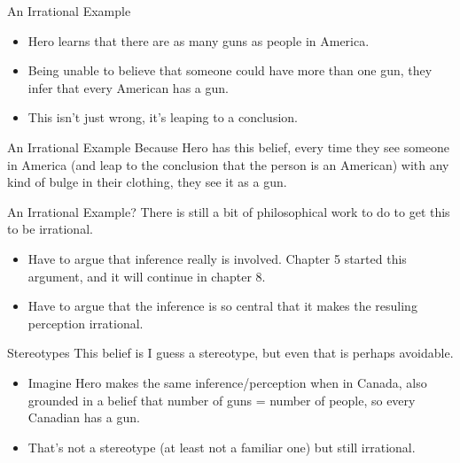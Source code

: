 \documentclass[
  17pt,
  letterpaper,
  ignorenonframetext,
  aspectratio=169,
  xcolor={dvipsnames}]{beamer}
\providecommand{\tightlist}{%
  \setlength{\itemsep}{0pt}\setlength{\parskip}{0pt}}\usepackage{longtable,booktabs,array}
\begin{document}
\begin{frame}{An Irrational Example}
\protect\hypertarget{an-irrational-example}{}
\begin{itemize}[<+->]
\tightlist
\item
  Hero learns that there are as many guns as people in America.
\item
  Being unable to believe that someone could have more than one gun,
  they infer that every American has a gun.
\item
  This isn't just wrong, it's leaping to a conclusion.
\end{itemize}
\end{frame}

\begin{frame}{An Irrational Example}
\protect\hypertarget{an-irrational-example-1}{}
Because Hero has this belief, every time they see someone in America
(and leap to the conclusion that the person is an American) with any
kind of bulge in their clothing, they see it as a gun.
\end{frame}

\begin{frame}{An Irrational Example?}
\protect\hypertarget{an-irrational-example-2}{}
There is still a bit of philosophical work to do to get this to be
irrational.

\begin{itemize}[<+->]
\tightlist
\item
  Have to argue that inference really is involved. Chapter 5 started
  this argument, and it will continue in chapter 8.
\item
  Have to argue that the inference is so central that it makes the
  resuling perception irrational.
\end{itemize}
\end{frame}

\begin{frame}{Stereotypes}
\protect\hypertarget{stereotypes}{}
This belief is I guess a stereotype, but even that is perhaps avoidable.

\begin{itemize}[<+->]
\tightlist
\item
  Imagine Hero makes the same inference/perception when in Canada, also
  grounded in a belief that number of guns = number of people, so every
  Canadian has a gun.
\item
  That's not a stereotype (at least not a familiar one) but still
  irrational.
\end{itemize}
\end{frame}
\end{document}

